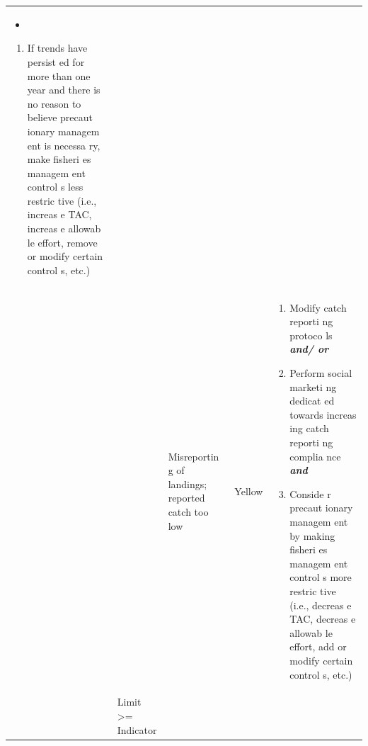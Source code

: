 \documentclass[]{book}
\providecommand{\tightlist}{%
  \setlength{\itemsep}{0pt}\setlength{\parskip}{0pt}}
\begin{document}
\begin{longtable}[]{@{}lllll@{}}
\begin{minipage}[t]{0.19\columnwidth}
\begin{itemize}
\item
\end{itemize}

\begin{enumerate}
\def\labelenumi{\arabic{enumi}.}
\setcounter{enumi}{1}
\tightlist
\item
  If trends have persist ed for more than one year and there is no
  reason to believe precaut ionary managem ent is necessa ry, make
  fisheri es managem ent control s less restric tive (i.e., increas e
  TAC, increas e allowab le effort, remove or modify certain control s,
  etc.)
\end{enumerate}\strut
\end{minipage}\tabularnewline
\begin{minipage}[t]{0.19\columnwidth}\raggedright\strut
\strut
\end{minipage} & \begin{minipage}[t]{0.19\columnwidth}\raggedright\strut
\strut
\end{minipage} & \begin{minipage}[t]{0.19\columnwidth}\raggedright\strut
Misreportin g of landings; reported catch too low\strut
\end{minipage} & \begin{minipage}[t]{0.19\columnwidth}\raggedright\strut
Yellow\strut
\end{minipage} & \begin{minipage}[t]{0.19\columnwidth}\raggedright\strut
\begin{enumerate}
\def\labelenumi{\arabic{enumi}.}
\item
  Modify catch reporti ng protoco ls \textbf{\emph{and/ or}}
\item
  Perform social marketi ng dedicat ed towards increas ing catch reporti
  ng complia nce \textbf{\emph{and} }
\item
  Conside r precaut ionary managem ent by making fisheri es managem ent
  control s more restric tive (i.e., decreas e TAC, decreas e allowab le
  effort, add or modify certain control s, etc.)
\end{enumerate}\strut
\end{minipage}\tabularnewline
\begin{minipage}[t]{0.19\columnwidth}\raggedright\strut
\strut
\end{minipage} & \begin{minipage}[t]{0.19\columnwidth}\raggedright\strut
Limit \textgreater{}= Indicator\strut
\end{minipage} & \begin{minipage}[t]{0.19\columnwidth}\raggedright\strut

\end{minipage}
\end{longtable}
\end{document}
